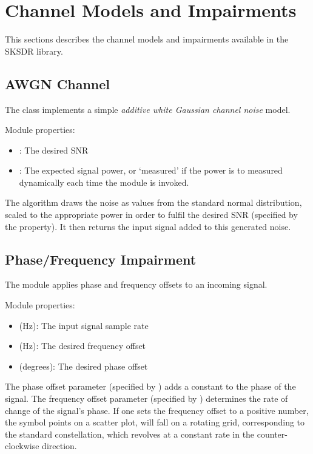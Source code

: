 \section{Channel Models and Impairments}
This sections describes the channel models and impairments available in the SKSDR library.

\subsection{AWGN Channel}

The  class implements a simple \emph{additive white Gaussian channel noise} model.

\noindent Module properties:
\begin{itemize}
  \item {}: The desired SNR
  \item {}: The expected signal power, or `measured' if the power is to measured dynamically each time the module is invoked.
\end{itemize}

The algorithm draws the noise as values from the standard normal distribution, scaled to the appropriate power in order to fulfil the desired SNR (specified by the  property). It then returns the input signal added to this generated noise.

\subsection{Phase/Frequency Impairment}
The  module applies phase and frequency offsets to an incoming signal.

\noindent Module properties:
\begin{itemize}
  \item {} (Hz): The input signal sample rate
  \item {} (Hz): The desired frequency offset
  \item {} (degrees): The desired phase offset
\end{itemize}

The phase offset parameter (specified by ) adds a constant to the phase of the signal. The frequency offset parameter (specified by ) determines the rate of change of the signal's phase. If one sets the frequency offset to a positive number, the symbol points on a scatter plot, will fall on a rotating grid, corresponding to the standard constellation, which revolves at a constant rate in the counter-clockwise direction.

